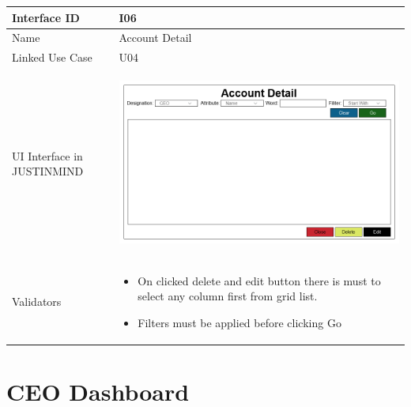 \documentclass[12pt,a4paper]{report}
\begin{document}
\begin{tabular}{ | m{3cm} | m{12cm}| } \hline

Interface ID &  I06 \\\hline

Name  	      &  Account Detail \\ \hline

Linked Use Case & U04 \\ \hline

UI Interface in JUSTINMIND & \begin{center} \includegraphics[scale=0.3]{./UIs for Latex Reports/UI-006 ViewsAndDelete Account@1x.png}\end{center}  \\ \hline

Validators & 
\begin{itemize}
\item   On clicked delete and edit button there is must to select any column first from grid list. 
\item  Filters must be applied before clicking Go


\end{itemize}
\\ \hline

\end{tabular} 
\section{CEO Dashboard }
\end{document}

